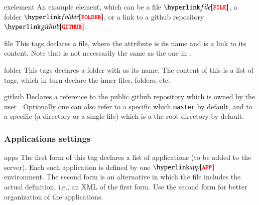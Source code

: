 \bigskip
\xmlstruct
{exelement}
{%
%
  An example element, which can be a file $\xmlstructref{file}$, a
  folder $\xmlstructref{folder}$, or a link to a github repository
  $\xmlstructref{github}$.
%
}
{}%


\bigskip
\xmlstruct
{file}
{%
%
  This tags declares a file, where the  attribute is its
  name and  is a link to its content. Note that  is
  not necessarily the same as the one in .
%
}
{}%

\bigskip
\xmlstruct
{folder}
{%
%
  This tags declares a folder with  as its name. The content
  of this is a list of  tags, which in turn
  declare the inner files, folders, etc.
%
}
{}%


\bigskip
\xmlstruct
{github}
{%
%
  Declares a reference to the public github repository 
  which is owned by the user . Optionally one can also
  refer to a specific  which \texttt{master} by default,
  and to a specific  (a directory or a single file) which is
  a the root directory by default.
%
}
{}%

\subsubsection*{Applications settings}

\bigskip
\xmlstruct
{apps}
{%
%
  The first form of this tag declares a list of applications (to be
  added to the server). Each such application is defined by one
  $\xmlstructref{app}$ environment.
% 
  The second form is an alternative in which the file 
  includes the actual definition, i.e., an XML of the first form. Use
  the second form for better organization of the applications.
%
}
{}%

